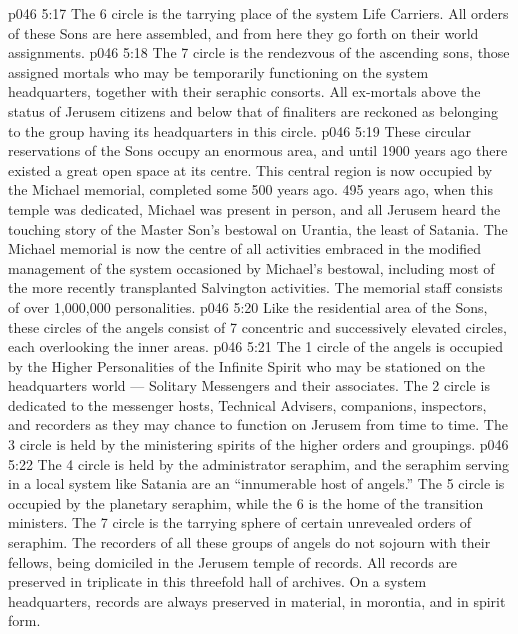 \vs p046 5:17 The 6 circle is the tarrying place of the system Life Carriers. All orders of these Sons are here assembled, and from here they go forth on their world assignments.
\vs p046 5:18 The 7 circle is the rendezvous of the ascending sons, those assigned mortals who may be temporarily functioning on the system headquarters, together with their seraphic consorts. All ex\hyp{}mortals above the status of Jerusem citizens and below that of finaliters are reckoned as belonging to the group having its headquarters in this circle.
\vs p046 5:19 These circular reservations of the Sons occupy an enormous area, and until 1900 years ago there existed a great open space at its centre. This central region is now occupied by the Michael memorial, completed some 500 years ago. 495 years ago, when this temple was dedicated, Michael was present in person, and all Jerusem heard the touching story of the Master Son’s bestowal on Urantia, the least of Satania. The Michael memorial is now the centre of all activities embraced in the modified management of the system occasioned by Michael’s bestowal, including most of the more recently transplanted Salvington activities. The memorial staff consists of over 1,000,000 personalities.
\vs p046 5:20 \bibnobreakspace {} Like the residential area of the Sons, these circles of the angels consist of 7 concentric and successively elevated circles, each overlooking the inner areas.
\vs p046 5:21 \pc The 1 circle of the angels is occupied by the Higher Personalities of the Infinite Spirit who may be stationed on the headquarters world --- Solitary Messengers and their associates. The 2 circle is dedicated to the messenger hosts, Technical Advisers, companions, inspectors, and recorders as they may chance to function on Jerusem from time to time. The 3 circle is held by the ministering spirits of the higher orders and groupings.
\vs p046 5:22 The 4 circle is held by the administrator seraphim, and the seraphim serving in a local system like Satania are an “innumerable host of angels.” The 5 circle is occupied by the planetary seraphim, while the 6 is the home of the transition ministers. The 7 circle is the tarrying sphere of certain unrevealed orders of seraphim. The recorders of all these groups of angels do not sojourn with their fellows, being domiciled in the Jerusem temple of records. All records are preserved in triplicate in this threefold hall of archives. On a system headquarters, records are always preserved in material, in morontia, and in spirit form.
